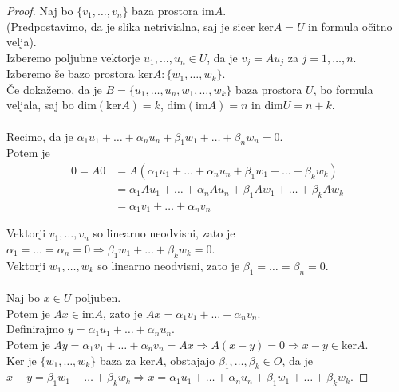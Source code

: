 \documentclass[a4paper,12pt]{article}
\begin{document}
\begin{proof}
Naj bo $\{v_1,\ldots,v_n\}$ baza prostora im$A$.\\

(Predpostavimo, da je slika netrivialna, saj je sicer ker$A=U$ in formula očitno velja).\\

Izberemo poljubne vektorje $u_1,\ldots,u_n\in U$, da je $v_j=Au_j$ za $j=1,\ldots,n$.\\

Izberemo še bazo prostora ker$A:\{w_1,\ldots,w_k\}$.\\

Če dokažemo, da je $B=\{u_1,\ldots,u_n,w_1,\ldots,w_k\}$ baza prostora $U$, bo formula veljala, saj bo dim$(\text{ker}A)=k$, dim$(\text{im}A)=n$ in dim$U=n+k$.\\

 \\

Recimo, da je $\alpha_1u_1+\ldots+\alpha_nu_n+\beta_1w_1+\ldots+\beta_nw_n=0$.\\

Potem je 
\begin{align*}
0=A0 & =A(\alpha_1u_1+\ldots+\alpha_nu_n+\beta_1w_1+\ldots+\beta_kw_k) \\
& = \alpha_1Au_1+\ldots+\alpha_nAu_n+\beta_1Aw_1+\ldots+\beta_kAw_k \\
& = \alpha_1v_1+\ldots+\alpha_nv_n
\end{align*}

Vektorji $v_1,\ldots,v_n$ so linearno neodvisni, zato je $\alpha_1=\ldots=\alpha_n=0 \Rightarrow \beta_1w_1+\ldots+\beta_kw_k=0$. \\

Vektorji $w_1,\ldots,w_k$ so linearno neodvisni, zato je $\beta_1=\ldots=\beta_n=0$.\\

 \\

Naj bo $x\in U$ poljuben.\\

Potem je $Ax\in \text{im}A$, zato je $Ax=\alpha_1v_1+\ldots+\alpha_nv_n$. \\

Definirajmo $y=\alpha_1u_1+\ldots+\alpha_nu_n$.\\

Potem je $Ay=\alpha_1v_1+\ldots+\alpha_nv_n=Ax\Rightarrow A(x-y)=0 \Rightarrow x-y\in \text{ker}A$.\\

Ker je $\{w_1,\ldots,w_k\}$ baza za ker$A$, obstajajo $\beta_1,\ldots,\beta_k\in O$, da je $x-y=\beta_1w_1+\ldots+\beta_kw_k\Rightarrow x=\alpha_1u_1+\ldots+\alpha_nu_n+\beta_1w_1+\ldots+\beta_kw_k$.
\end{proof}
\end{document}
